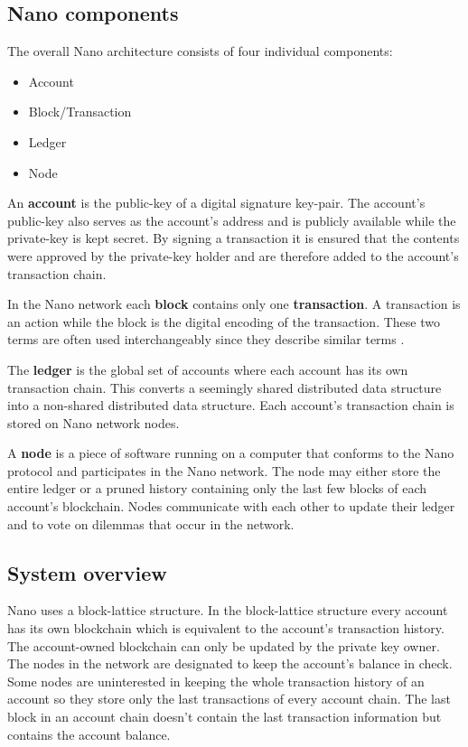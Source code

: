 \documentclass{ferseminar}
\begin{document}
\subsection{Nano components}
The overall Nano architecture consists of four individual components:
\begin{itemize}
	\item Account
	\item Block/Transaction
	\item Ledger
	\item Node
\end{itemize}

An \textbf{account} is the public-key of a digital signature key-pair. The account's public-key also serves as the account's address and is publicly available while the private-key is kept secret. By signing a transaction it is ensured that the contents were approved by the private-key holder and are therefore added to the account's transaction chain. 

In the Nano network each \textbf{block} contains only one \textbf{transaction}. A transaction is an action while the block is the digital encoding of the transaction. These two terms are often used interchangeably since they describe similar terms \cite{Nano}.

The \textbf{ledger} is the global set of accounts where each account has its own transaction chain. This converts a seemingly shared distributed data structure into a non-shared distributed data structure. Each account's transaction chain is stored on Nano network nodes.

A \textbf{node} is a piece of software running on a computer that conforms to the Nano protocol and participates in the Nano network. The node may either store the entire ledger or a pruned history containing only the last few blocks of each account's blockchain. Nodes communicate with each other to update their ledger and to vote on dilemmas that occur in the network.

\subsection{System overview}

Nano uses a block-lattice structure. In the block-lattice structure every account has its own blockchain which is equivalent to the account's transaction history. The account-owned blockchain can only be updated by the private key owner. The nodes in the network are designated to keep the account's balance in check. Some nodes are uninterested in keeping the whole transaction history of an account so they store only the last transactions of every account chain. The last block in an account chain doesn't contain the last transaction information but contains the account balance.
\end{document}
